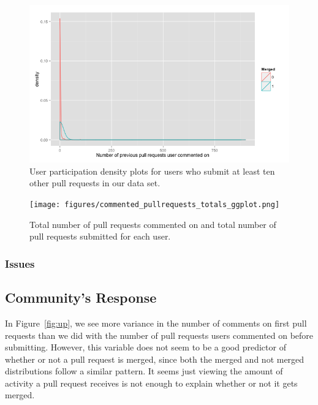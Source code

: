 \documentclass{sigchi}
\begin{document}
\begin{figure}[p] \centering
\includegraphics[width=0.9\columnwidth]{figures/number_comments_density_repeaters_10_ggplot.png}
\caption{User participation density plots for users who submit at least ten
other pull requests in our data set.} \label{fig:repeaters_10} \end{figure}

\begin{figure}[p] \centering
\texttt{[image: figures/commented\_pullrequests\_totals\_ggplot.png]}
\caption{Total number of pull requests commented on and total number of pull
requests submitted for each user.} \label{fig:commented_pullrequests_totals}
\end{figure}

\subsubsection{Issues}


\subsection{Community's Response} In Figure~\ref{fig:up}, we see more variance
in the number of comments on first pull requests than we did with the number of
pull requests users commented on before submitting. However, this variable does
not seem to be a good predictor of whether or not a pull request is merged,
since both the merged and not merged distributions follow a similar pattern. It
seems just viewing the amount of activity a pull request receives is not enough
to explain whether or not it gets merged.
\end{document}

